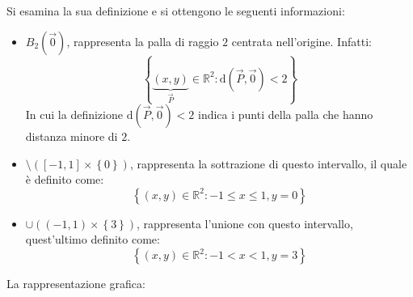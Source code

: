 \documentclass[a4paper]{article}
\begin{document}
	\noindent
	Si esamina la sua definizione e si ottengono le seguenti informazioni:
	
	\begin{itemize}[label=-]
		\item $B_{2}\left(\overrightarrow{0}\right)$, rappresenta la palla di raggio $2$ centrata nell'origine. Infatti:
		\begin{equation*}
			\left\{\underbrace{\left(x,y\right)}_{\overrightarrow{P}} \in \mathbb{R}^{2} : \mathrm{d}\left(\overrightarrow{P}, \overrightarrow{0}\right) < 2\right\}
		\end{equation*}
		In cui la definizione $\mathrm{d}\left(\overrightarrow{P}, \overrightarrow{0}\right) < 2$ indica i punti della palla che hanno distanza minore di $2$.
		
		\item $\setminus \left(\left[-1,1\right] \times \left\{0\right\}\right)$, rappresenta la sottrazione di questo intervallo, il quale è definito come:
		\begin{equation*}
			\left\{\left(x,y\right) \in \mathbb{R}^{2} : -1 \le x \le 1, y = 0\right\}
		\end{equation*}
	
		\item $\cup \left(\left(-1,1\right) \times \left\{3\right\}\right)$, rappresenta l'unione con questo intervallo, quest'ultimo definito come:
		\begin{equation*}
			\left\{\left(x,y\right) \in \mathbb{R}^{2} : -1 < x < 1, y = 3\right\}
		\end{equation*}
	\end{itemize}

	\noindent
	La rappresentazione grafica:
	
\end{document}
